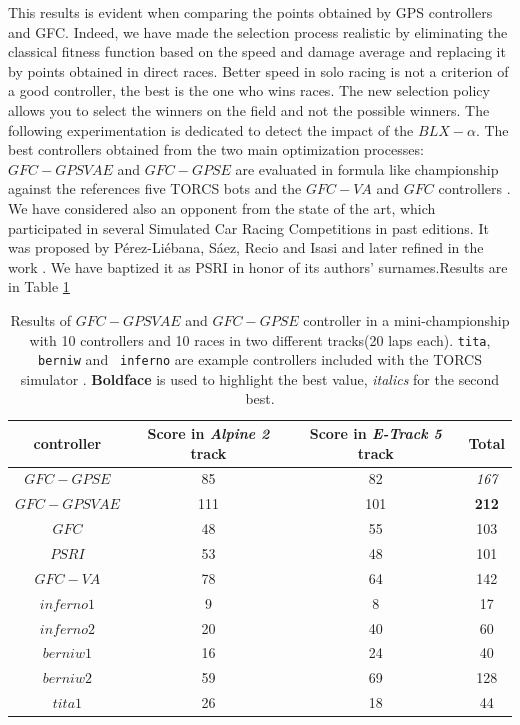 \documentclass[10pt,journal,compsoc]{IEEEtran}
\begin{document}
This results is evident when comparing the points obtained by GPS controllers and GFC.
Indeed, we have made the selection process  realistic by eliminating
the classical fitness function based on the speed and damage average
and replacing it by points obtained in direct races. 
Better speed in solo racing is not a criterion of a good controller, the
best is the one who wins races. The new selection policy allows you to
select the winners on the field and not the possible winners. 
The following experimentation is dedicated to detect the impact of the $BLX-\alpha$.
The best controllers obtained from the two main optimization
processes: $GFC-GPSVAE$ and $GFC-GPSE$ are evaluated in formula like
championship against the references five TORCS bots and the $GFC-VA$\cite{DBLP:conf/cig/SalemMG19}
and $GFC$ controllers  \cite{salem_cig2018}. We have considered also an opponent from the
state of the art, which participated in several Simulated Car Racing
Competitions in past editions.  %
It was proposed by P{\'e}rez-Li{\'e}bana, S{\'a}ez, Recio and Isasi \cite{EvolvingRuleSystem08} and later refined in the work \cite{PerezEvolvingFuzzy09}. We have baptized it as PSRI in honor of its authors' surnames.Results are in Table \ref{tab:allsresults}
%
\begin{table}[ht]
	\centering
	{\scriptsize
		\caption{ Results of $GFC-GPSVAE$ and $GFC-GPSE$
                  controller in a mini-championship with 10 controllers
                  and 10 %
			races in two different tracks(20 laps each). {\tt tita}, {\tt berniw} and {\tt
				inferno} are example controllers included with the TORCS
			simulator \cite{torcs4}.  {\bf Boldface} is
                        used to highlight the best value, {\em italics} for the second
                    best.}
		{
			\begin{tabular}{|c|c|c||c|}
				\hline
				controller&Score in \textit{Alpine 2} track &Score in \textit{E-Track 5} track &Total\\
				\hline
				\hline
$GFC-GPSE$&	85&	82&	{\em 167}\\
$GFC-GPSVAE$&111&101&            {\bf 212}\\
$GFC$  \cite{salem_cig2018}&		48&	55&	103\\
$PSRI$\cite{PerezEvolvingFuzzy09}&		53&	48&	101\\
$GFC-VA$ \cite{DBLP:conf/cig/SalemMG19}&	78&	64&	142\\
$inferno1$&	9&	8&	17\\
$inferno2$&	20&	40&	60\\
$berniw1$&	16&	24&	40\\
$berniw2$&	59&	69&	128\\
$tita1$&	26&	18&	44\\
					\hline
				
			\end{tabular}
		}\label{tab:allsresults}
	}
\end{table}
%
\end{document}
